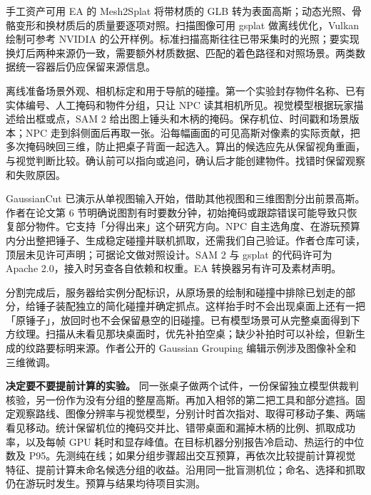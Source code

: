 \documentclass[UTF8,11pt,fontset=fandol,a4paper]{ctexart}
\begin{document}
手工资产可用 EA 的 Mesh2Splat 将带材质的 GLB 转为表面高斯；动态光照、骨骼变形和换材质后的质量要逐项对照。扫描图像可用 gsplat 做离线优化，Vulkan 绘制可参考 NVIDIA 的公开样例。标准扫描高斯往往已带采集时的光照；要实现换灯后两种来源仍一致，需要额外材质数据、匹配的着色路径和对照场景。两类数据统一容器后仍应保留来源信息。\quad{}\quad{}

离线准备场景外观、相机标定和用于导航的碰撞。第一个实验封存物件名称、已有实体编号、人工掩码和物件分组，只让 NPC 读其相机所见。视觉模型根据玩家描述给出框或点，SAM 2 给出图上锤头和木柄的掩码。保存机位、时间戳和场景版本；NPC 走到斜侧面后再取一张。沿每幅画面的可见高斯对像素的实际贡献，把多次掩码映回三维，防止把桌子背面一起选入。算出的候选应先从保留视角重画，与视觉判断比较。确认前可以指向或追问，确认后才能创建物件。找错时保留观察和失败原因。

GaussianCut 已演示从单视图输入开始，借助其他视图和三维图割分出前景高斯。作者在论文第 6 节明确说图割有时要数分钟，初始掩码或跟踪错误可能导致只恢复部分物件。它支持「分得出来」这个研究方向。NPC 自主选角度、在游玩预算内分出整把锤子、生成稳定碰撞并联机抓取，还需我们自己验证。作者仓库可读，顶层未见许可声明；可据论文做对照设计。SAM 2 与 gsplat 的代码许可为 Apache 2.0，接入时另查各自依赖和权重。EA 转换器另有许可及素材声明。\quad{}\quad{}

分割完成后，服务器给实例分配标识，从原场景的绘制和碰撞中排除已划走的部分，给锤子装配独立的简化碰撞并确定抓点。这样抬手时不会出现桌面上还有一把「原锤子」，放回时也不会保留悬空的旧碰撞。已有模型场景可从完整桌面得到下方纹理。扫描从未看见那块桌面时，优先补拍空桌；缺少补拍时可以补绘，但新生成的纹路要标明来源。作者公开的 Gaussian Grouping 编辑示例涉及图像补全和三维微调。

\textbf{决定要不要提前计算的实验。} 同一张桌子做两个试件，一份保留独立模型供裁判核验，另一份作为没有分组的整屋高斯。再加入相邻的第二把工具和部分遮挡。固定观察路线、图像分辨率与视觉模型，分别计时首次指对、取得可移动子集、两端看见移动。统计保留机位的掩码交并比、错带桌面和漏掉木柄的比例、抓取成功率，以及每帧 GPU 耗时和显存峰值。在目标机器分别报告冷启动、热运行的中位数及 P95。先测纯在线；如果分组步骤超出交互预算，再依次比较提前计算视觉特征、提前计算未命名候选分组的收益。沿用同一批盲测机位；命名、选择和抓取仍在游玩时发生。预算与结果均待项目实测。
\end{document}

